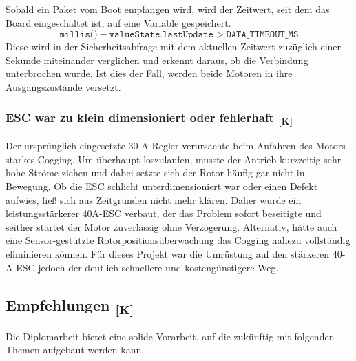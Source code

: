 \documentclass[a4paper,12pt]{article}
\begin{document}
Sobald ein Paket vom Boot empfangen wird, wird der Zeitwert, seit dem das Board eingeschaltet ist, auf eine Variable gespeichert. 
\begin{equation}
\texttt{millis()} - \texttt{valueState.lastUpdate} > \texttt{DATA\_TIMEOUT\_MS}
\end{equation}
Diese wird in der Sicherheitsabfrage mit dem aktuellen Zeitwert zuzüglich einer Sekunde miteinander verglichen und erkennt daraus, ob die Verbindung unterbrochen wurde. Ist dies der Fall, werden beide Motoren in ihre Ausgangszustände versetzt.


\subsubsection{\texorpdfstring{ESC war zu klein dimensioniert oder fehlerhaft \textsubscript{[K]}}{ESC war zu klein dimensioniert oder fehlerhaft [K]}}

Der ursprünglich eingesetzte 30-A-Regler verursachte beim Anfahren des Motors starkes Cogging\cite{rci_cogging}. Um überhaupt loszulaufen, musste der Antrieb kurzzeitig sehr hohe Ströme ziehen und dabei setzte sich der Rotor häufig gar nicht in Bewegung. Ob die ESC schlicht unterdimensioniert war oder einen Defekt aufwies, ließ sich aus Zeitgründen nicht mehr klären. Daher wurde ein leistungsstärkerer 40A-ESC verbaut, der das Problem sofort beseitigte und seither startet der Motor zuverlässig ohne Verzögerung.
Alternativ, hätte auch eine Sensor-gestützte Rotorpositionsüberwachung das Cogging nahezu vollständig eliminieren können. Für dieses Projekt war die Umrüstung auf den stärkeren 40-A-ESC jedoch der deutlich schnellere und kostengünstigere Weg.
\newpage
\subsection{\texorpdfstring{Empfehlungen \textsubscript{[K]}}{Empfehlungen [K]}}

Die Diplomarbeit bietet eine solide Vorarbeit, auf die zukünftig mit folgenden Themen aufgebaut werden kann.
\end{document}
